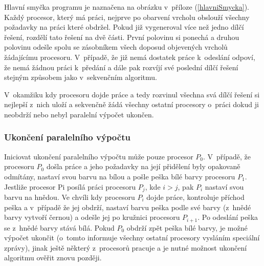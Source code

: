 \documentclass[12pt]{article}
\begin{document}
Hlavní smyčka programu je naznačena na obrázku v~příloze (\ref{hlavniSmycka}). Každý procesor, který má práci, nejprve po obarvení vrcholu obslouží všechny požadavky na práci které obdržel. Pokud již vygeneroval více než jedno dílčí řešení, rozdělí tato řešení na dvě části. První polovinu si ponechá a druhou polovinu odešle spolu se zásobníkem všech doposud objevených vrcholů žádajícímu procesoru. V~případě, že již nemá dostatek práce k~odeslání odpoví, že nemá žádnou práci k~předání a dále pak rozvíjí své poslední dílčí řešení stejným způsobem jako v~sekvenčním algoritmu.

V~okamžiku kdy procesoru dojde práce a tedy rozvinul všechna svá dílčí řešení si nejlepší z~nich uloží a sekvenčně žádá všechny ostatní procesory o~práci dokud ji neobdrží nebo nebyl paralelní výpočet ukončen.

\subsubsection{Ukončení paralelního výpočtu}

Iniciovat ukončení paralelního výpočtu může pouze procesor $P_0$. V~případě, že procesoru $P_0$ došla práce a jeho požadavky na její přidělení byly opakovaně odmítány, nastaví svou barvu na bílou a pošle peška bílé barvy procesoru $P_1$. Jestliže procesor Pi posílá práci procesoru $P_j$, kde $i>j$, pak $P_i$ nastaví svou barvu na hnědou. Ve chvíli kdy procesoru $P_i$ dojde práce, kontroluje příchod peška a v~případě že jej obdrží, nastaví barvu peška podle své barvy (z~hnědé barvy vytvoří černou) a odešle jej po kružnici procesoru $P_{i+1}$. Po odeslání peška se z~hnědé barvy stává bílá. Pokud $P_0$ obdrží zpět peška bílé barvy, je možné výpočet ukončit (o~tomto informuje všechny ostatní procesory vysláním speciální zprávy), jinak ještě některý z~procesorů pracuje a je nutné možnost ukončení algoritmu ověřit znovu později.
\end{document}
